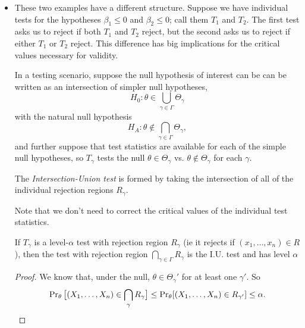 \begin{itemize}[leftmargin=0pt]
\item These two examples have a different structure.  Suppose we have
  individual tests for the hypotheses $\beta_1 \leq 0$ and $\beta_2
  \leq 0$; call them $T_1$ and $T_2$.  The first test asks us to
  reject if both $T_1$ and $T_2$ reject, but the second asks us to
  reject if either $T_1$ or $T_2$ reject.  This difference has big
  implications for the critical values necessary for validity.

  \begin{defn}
    In a testing scenario, suppose the null hypothesis of interest can
    be can be written as an intersection of simpler null hypotheses,
    \begin{equation*}
      H_0: \theta \in \bigcup_{\gamma \in \Gamma} \Theta_\gamma
    \end{equation*}
    with the natural null hypothesis
    \begin{equation*}
      H_A: \theta \notin \bigcap_{\gamma \in \Gamma} \Theta_\gamma,
    \end{equation*}
    and further suppose that test statistics are available for each of
    the simple null hypotheses, so $T_\gamma$ tests the null $\theta
    \in \Theta_\gamma$ vs. $\theta \notin \Theta_\gamma$ for each
    $\gamma$.
    
    The \emph{Intersection-Union test} is formed by taking the
    intersection of all of the individual rejection regions $R_\gamma$.
  \end{defn}
  
  Note that we don't need to correct the critical values of the
  individual test statistics.

  \begin{thm}
    If $T_\gamma$ is a level-$\alpha$ test with rejection region
    $R_\gamma$ (ie it rejects if $(x_1,\dots,x_n) \in R$), then the
    test with rejection region $\bigcap_{\gamma \in \Gamma} R_\gamma$
    is the I.U. test and has level $\alpha$
  \end{thm}

  \begin{proof}
    We know that, under the null, $\theta \in \Theta_\gamma'$ for at
    least one $\gamma'$.  So
    \begin{equation*}
      \Pr_\theta\big[(X_1,\dots,X_n) \in \bigcap_\gamma R_\gamma\big]
      \leq \Pr_\theta[(X_1,\dots, X_n) \in R_{\gamma'}]
      \leq \alpha. \qedhere
    \end{equation*}
  \end{proof}


\end{itemize}
